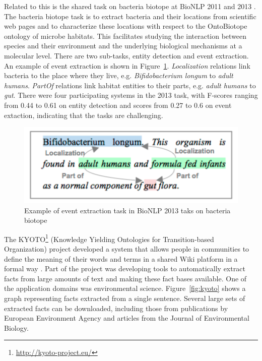 Related to this is the shared task on bacteria biotope at BioNLP 2011 and 2013 \citep{bossy2013bionlp}.
The bacteria biotope task is to extract bacteria and their locations from scientific web pages and to characterize these locations with respect to the OntoBiotope ontology of microbe habitats.
This facilitates studying the interaction between species and their environment and  the underlying biological mechanisms at a molecular level.
There are two sub-tasks, entity detection and event extraction.
An example of event extraction is shown in Figure~\ref{fig:biotope}.
\emph{Localization} relations link bacteria to the place where they live, e.g. \emph{Bifidobacterium longum} to \emph{adult humans}.
\emph{PartOf} relations link habitat entities to their parts, e.g. \emph{adult humans} to \emph{gut}.
There were four participating systems in the 2013 task, with F-scores ranging from 0.44 to 0.61 on entity detection and scores from 0.27 to 0.6 on event extaction, indicating that the tasks are challenging. 

\begin{figure}
\begin{center}
\includegraphics[scale=0.6]{figures/biotope.pdf}
 \caption{Example of event extraction task in BioNLP 2013 taks on bacteria biotope \citep{bossy2013bionlp}}
\label{fig:biotope}
\end{center}
\end{figure} 

The KYOTO\footnote{\url{http://kyoto-project.eu/}} (Knowledge Yielding Ontologies for Transition-based Organization) project developed a system that allows people in communities to define the meaning of their words and terms in a shared Wiki platform in a formal way \citep{Vossen2008}.
Part of the project was developing tools to automatically extract facts from large amounts of text and making these fact bases available.
One of the application domains was environmental science.
Figure~\ref{fig:kyoto} shows a graph representing facts extracted from a single sentence.
Several large sets of extracted facts can be downloaded, including those from publications by European Environment Agency and articles from the Journal of Environmental Biology.  

